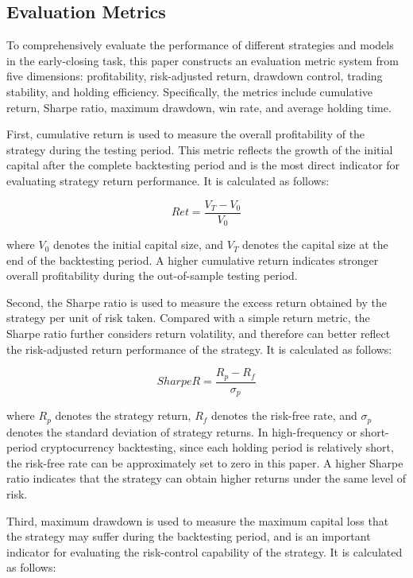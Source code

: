 \documentclass[12pt]{article}
\begin{document}
\subsection{Evaluation Metrics}

To comprehensively evaluate the performance of different strategies and models in the 
early-closing task, this paper constructs an evaluation metric system from five dimensions: 
profitability, risk-adjusted return, drawdown control, trading stability, and holding 
efficiency. Specifically, the metrics include cumulative return, Sharpe ratio, maximum 
drawdown, win rate, and average holding time.

First, cumulative return is used to measure the overall profitability of the strategy during 
the testing period. This metric reflects the growth of the initial capital after the complete 
backtesting period and is the most direct indicator for evaluating strategy return 
performance. It is calculated as follows:

\begin{equation}
    Ret = \frac{V_T - V_0}{V_0}
\end{equation}

where $V_0$ denotes the initial capital size, and $V_T$ denotes the capital size at the end 
of the backtesting period. A higher cumulative return indicates stronger overall profitability 
during the out-of-sample testing period.

Second, the Sharpe ratio is used to measure the excess return obtained by the strategy per 
unit of risk taken. Compared with a simple return metric, the Sharpe ratio further considers 
return volatility, and therefore can better reflect the risk-adjusted return performance of 
the strategy. It is calculated as follows:

\begin{equation}
    SharpeR = \frac{R_p - R_f}{\sigma_p}
\end{equation}

where $R_p$ denotes the strategy return, $R_f$ denotes the risk-free rate, and $\sigma_p$ 
denotes the standard deviation of strategy returns. In high-frequency or short-period 
cryptocurrency backtesting, since each holding period is relatively short, the risk-free rate 
can be approximately set to zero in this paper. A higher Sharpe ratio indicates that the 
strategy can obtain higher returns under the same level of risk.

Third, maximum drawdown is used to measure the maximum capital loss that the strategy may 
suffer during the backtesting period, and is an important indicator for evaluating the 
risk-control capability of the strategy. It is calculated as follows:
\end{document}

